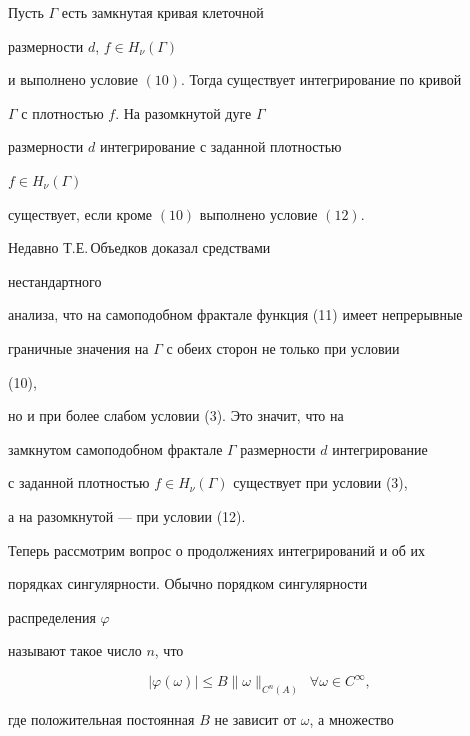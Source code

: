 \begin{thm} Пусть $\Gamma$ есть замкнутая кривая клеточной 


размерности $d$, $f\in H_\nu(\Gamma)$ 


и выполнено условие $(10)$. Тогда существует интегрирование по кривой 


$\Gamma$ с плотностью $f$. На разомкнутой дуге $\Gamma$ 


размерности $d$ интегрирование с заданной плотностью 


$f\in H_\nu(\Gamma)$ 


существует, если кроме $(10)$ выполнено условие $(12)$. 


\end{thm} 


 


\begin{note} Недавно Т.Е.\,Объедков доказал средствами 


нестандартного 


анализа, что на самоподобном фрактале функция (11) имеет непрерывные 


граничные значения на $\Gamma$ с обеих сторон не только при условии 


(10), 


но и при более слабом условии (3). Это значит, что на 


замкнутом самоподобном фрактале $\Gamma$ размерности $d$ интегрирование 


с заданной плотностью $f\in H_\nu(\Gamma)$ существует при условии (3), 


а на разомкнутой --- при условии (12). 


\end{note} 


 


Теперь рассмотрим вопрос о продолжениях интегрирований и об их 


порядках сингулярности. Обычно \cite{12} порядком сингулярности 


распределения $\varphi$ 


называют такое число $n$, что 


$$ 


|\varphi(\omega)|\le B\|\omega\|_{C^n(A)}\ \; 


\forall\omega\in C^\infty, 


$$ 


где положительная постоянная $B$ не зависит от $\omega$, а множество 


